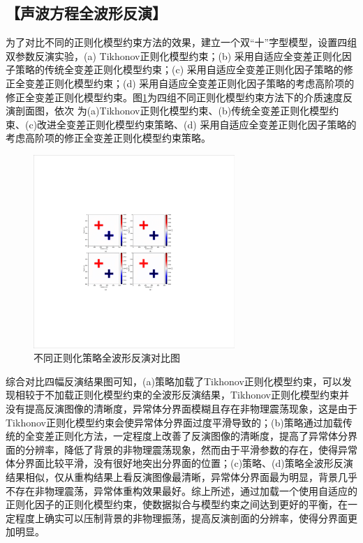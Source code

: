 \documentclass[11pt]{article}
\newcommand{\kai}{\CJKfamily{kai}}
\begin{document}
\subsection*{\kai\fontsize{11pt}{10pt} \selectfont【声波方程全波形反演】}
为了对比不同的正则化模型约束方法的效果，建立一个双``十''字型模型，设置四组双参数反演实验，(a) Tikhonov正则化模型约束；(b) 采用自适应全变差正则化因子策略的传统全变差正则化模型约束；(c) 采用自适应全变差正则化因子策略的修正全变差正则化模型约束；(d) 采用自适应全变差正则化因子策略的考虑高阶项的修正全变差正则化模型约束。图\ref{Fig_CrossModel}为四组不同正则化模型约束方法下的介质速度反演剖面图，依次
为(a)Tikhonov正则化模型约束、(b)传统全变差正则化模型约束、(c)改进全变差正则化模型约束策略、(d) 采用自适应全变差正则化因子策略的考虑高阶项的修正全变差正则化模型约束策略。
\begin{figure}[htbp]
\centering
\includegraphics[width=3in]{./FigureFolder/Foundation/FWI/CrossModel.pdf}
\caption{不同正则化策略全波形反演对比图}
\label{Fig_CrossModel}
\end{figure}
\par
综合对比四幅反演结果图可知，(a)策略加载了Tikhonov正则化模型约束，可以发现相较于不加载正则化模型约束的全波形反演结果，Tikhonov正则化模型约束并没有提高反演图像的清晰度，异常体分界面模糊且存在非物理震荡现象，这是由于Tikhonov正则化模型约束会使异常体分界面过度平滑导致的；(b)策略通过加载传统的全变差正则化方法，一定程度上改善了反演图像的清晰度，提高了异常体分界面的分辨率，降低了背景的非物理震荡现象，然而由于平滑参数的存在，使得异常体分界面比较平滑，没有很好地突出分界面的位置；(c)策略、(d)策略全波形反演结果相似，仅从重构结果上看反演图像最清晰，异常体分界面最为明显，背景几乎不存在非物理震荡，异常体重构效果最好。综上所述，通过加载一个使用自适应的正则化因子的正则化模型约束，使数据拟合与模型约束之间达到更好的平衡，在一定程度上确实可以压制背景的非物理振荡，提高反演剖面的分辨率，使得分界面更加明显。
\end{document}
